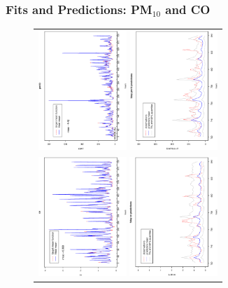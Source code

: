 \documentclass[dvips]{beamer}
\newcommand{\bs}[2]{\begin{frame} \frametitle{#1} 
{#2}
\end{frame} }
\begin{document}
\bs{Fits and Predictions: PM$_{10}$ and CO} {
\begin{figure}[!h]
  \begin{center}\vspace{-5mm}
    \begin{tabular}{c}
      \includegraphics[height=45mm, clip=1, angle=270]{30jointpm10fitted.ps}
      \includegraphics[height=45mm, clip=1, angle=270]{5dayjointpredpm10.ps}\\
      \includegraphics[height=45mm, clip=1, angle=270]{30jointcofitted.ps}
      \includegraphics[height=45mm, clip=1, angle=270]{5dayjointpredco.ps}
    \end{tabular}
  \end{center}
\end{figure}
}
\end{document}
